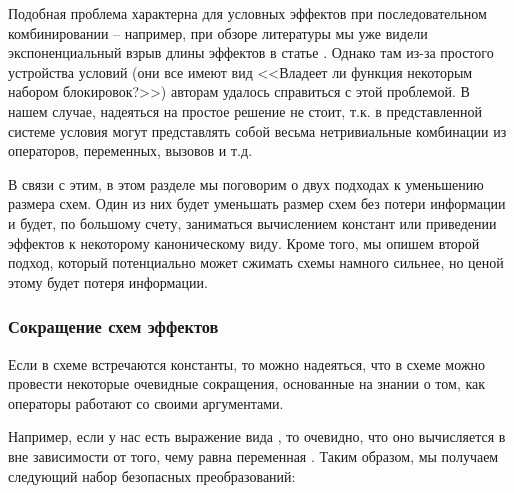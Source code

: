 Подобная проблема характерна для условных эффектов при последовательном комбинировании -- например, при обзоре литературы мы уже видели экспоненциальный взрыв длины эффектов в статье  \cite{Flanagan08}. Однако там из-за простого устройства условий (они все имеют вид <<Владеет ли функция некоторым набором блокировок?>>) авторам удалось справиться с этой проблемой. В нашем случае, надеяться на простое решение не стоит, т.к. в представленной системе условия могут представлять собой весьма нетривиальные комбинации из операторов, переменных, вызовов и т.д.

В связи с этим, в этом разделе мы поговорим о двух подходах к уменьшению размера схем. Один из них будет уменьшать размер схем без потери информации и будет, по большому счету, заниматься вычислением констант или приведении эффектов к некоторому каноническому виду. Кроме того, мы опишем второй подход, который потенциально может сжимать схемы намного сильнее, но ценой этому будет потеря информации. 


\subsubsection{Сокращение схем эффектов}

Если в схеме встречаются константы, то можно надеяться, что в схеме можно провести некоторые очевидные сокращения, основанные на знании о том, как операторы работают со своими аргументами.

Например, если у нас есть выражение вида , то очевидно, что оно вычисляется в  вне зависимости от того, чему равна переменная . Таким образом, мы получаем следующий набор безопасных преобразований:

